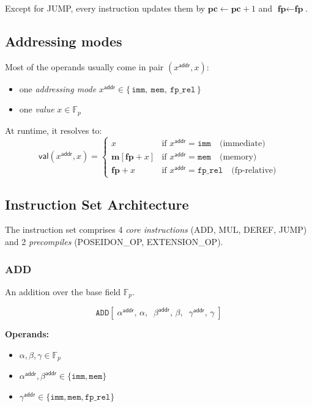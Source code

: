\documentclass{article}
\theoremstyle{definition}
\newcommand{\Fp}{\mathbb F_p}
\begin{document}
 Except for JUMP, every instruction updates them by $\textbf{pc} \gets \textbf{pc} + 1$ and $\textbf{fp} \gets \textbf{fp}$.



\subsection{Addressing modes}\label{sec:addressing-modes}

Most of the operands usually come in pair $(x^\textsf{addr}, x)$:
\begin{itemize}
    \item one \textit{addressing mode} $x^\textsf{addr} \in \{\,\texttt{imm},\ \texttt{mem},\ \texttt{fp\_rel}\,\}$
    \item one \textit{value} $x \in \Fp$
\end{itemize}

At runtime, it resolves to:
\[
\mathsf{val}(x^\textsf{addr}, x) =
\begin{cases}
x & \text{if } x^\textsf{addr} = \texttt{imm} \quad \text{(immediate)} \\
\textbf{m}[\textbf{fp} + x] & \text{if } x^\textsf{addr} = \texttt{mem} \quad \text{(memory)} \\
\textbf{fp} + x & \text{if } x^\textsf{addr} = \texttt{fp\_rel} \quad \text{(fp-relative)}
\end{cases}
\]
\subsection{Instruction Set Architecture}\label{sec:isa}

The instruction set comprises 4 \emph{core instructions} (ADD, MUL, DEREF, JUMP) and 2 \emph{precompiles} (POSEIDON\_OP, EXTENSION\_OP).




\subsubsection{ADD}

An addition over the base field $\Fp$.

\[
\texttt{ADD}[\;\alpha^\textsf{addr},\, \alpha,\;\; \beta^\textsf{addr},\, \beta,\;\; \gamma^\textsf{addr},\, \gamma\;]
\]

\textbf{Operands:}
\begin{itemize}
    \item $\alpha, \beta, \gamma \in \Fp$
    \item $\alpha^\textsf{addr}, \beta^\textsf{addr} \in \{\texttt{imm}, \texttt{mem}\}$
    \item $\gamma^\textsf{addr} \in \{\texttt{imm}, \texttt{mem}, \texttt{fp\_rel}\}$
\end{itemize}
\end{document}
